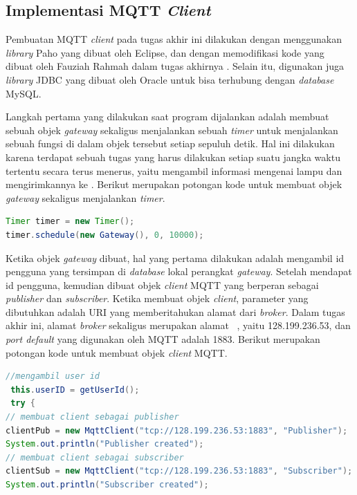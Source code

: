 \subsection{Implementasi MQTT \textit{Client}}
Pembuatan MQTT \textit{client} pada tugas akhir ini dilakukan dengan menggunakan \textit{library} Paho yang dibuat oleh Eclipse, dan dengan memodifikasi kode yang dibuat oleh Fauziah Rahmah dalam tugas akhirnya \cite{SkripsiFarah}. Selain itu, digunakan juga \textit{library} JDBC yang dibuat oleh Oracle untuk bisa terhubung dengan \textit{database} MySQL.

Langkah pertama yang dilakukan saat program dijalankan adalah membuat sebuah objek \textit{gateway} sekaligus menjalankan sebuah \textit{timer} untuk menjalankan sebuah fungsi di dalam objek tersebut setiap sepuluh detik. Hal ini dilakukan karena terdapat sebuah tugas yang harus dilakukan setiap suatu jangka waktu tertentu secara terus menerus, yaitu mengambil informasi mengenai lampu dan mengirimkannya ke \plat. Berikut merupakan potongan kode untuk membuat objek \textit{gateway} sekaligus menjalankan \textit{timer}.

\begin{lstlisting}[language=Java,label=code:timer,caption=Membuat objek \textit{gateway}]
Timer timer = new Timer();
timer.schedule(new Gateway(), 0, 10000);
\end{lstlisting}

Ketika objek \textit{gateway} dibuat, hal yang pertama dilakukan adalah mengambil id pengguna yang tersimpan di \textit{database} lokal perangkat \textit{gateway}. Setelah mendapat id pengguna, kemudian dibuat objek \textit{client} MQTT yang berperan sebagai \textit{publisher} dan \textit{subscriber}. Ketika membuat objek \textit{client}, parameter yang dibutuhkan adalah URI yang memberitahukan alamat dari \textit{broker}. Dalam tugas akhir ini, alamat \textit{broker} sekaligus merupakan alamat \plat~, yaitu 128.199.236.53, dan \textit{port default} yang digunakan oleh MQTT adalah 1883. Berikut merupakan potongan kode untuk membuat objek \textit{client} MQTT.

 \begin{lstlisting}[language=Java,label=code:client,caption=Membuat objek \textit{client} MQTT]
 //mengambil user id
 this.userID = getUserId();
 try {
// membuat client sebagai publisher
clientPub = new MqttClient("tcp://128.199.236.53:1883", "Publisher");
System.out.println("Publisher created");
// membuat client sebagai subscriber
clientSub = new MqttClient("tcp://128.199.236.53:1883", "Subscriber");
System.out.println("Subscriber created");
 \end{lstlisting}
 
